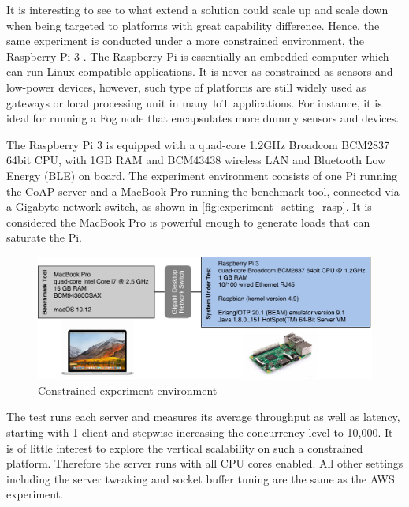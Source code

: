 It is interesting to see to what extend a solution could scale up and scale down when being targeted to platforms with great capability difference. Hence, the same experiment is conducted under a more constrained environment, the Raspberry Pi 3 \autocite{raspberry_pi}. The Raspberry Pi is essentially an embedded computer which can run Linux compatible applications. It is never as constrained as sensors and low-power devices, however, such type of platforms are still widely used as gateways or local processing unit in many IoT applications. For instance, it is ideal for running a Fog node that encapsulates more dummy sensors and devices.

The Raspberry Pi 3 is equipped with a quad-core 1.2GHz Broadcom BCM2837 64bit CPU, with 1GB RAM and BCM43438 wireless LAN and Bluetooth Low Energy (BLE) on board. The experiment environment consists of one Pi running the CoAP server and a MacBook Pro running the benchmark tool, connected via a Gigabyte network switch, as shown in \autoref{fig:experiment_setting_rasp}. It is considered the MacBook Pro is powerful enough to generate loads that can saturate the Pi. 

\begin{figure}[!htbp]
\centering
\includegraphics[scale = 0.55]{experiment_setting_rasp}
\caption{Constrained experiment environment}
\label{fig:experiment_setting_rasp}
\end{figure}

The test runs each server and measures its average throughput as well as latency, starting with 1 client and stepwise increasing the concurrency level to 10,000. It is of little interest to explore the vertical scalability on such a constrained platform. Therefore the server runs with all CPU cores enabled. All other settings including the server tweaking and socket buffer tuning are the same as the AWS experiment.


